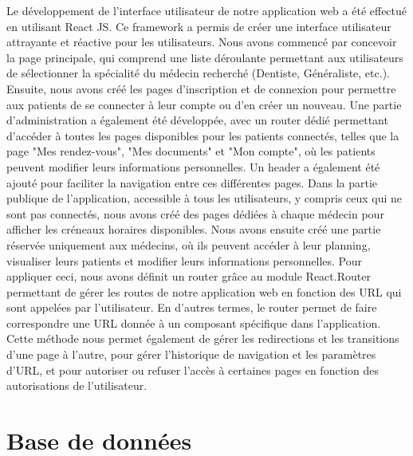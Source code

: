 \documentclass[a4paper]{report}
\begin{document}
Le développement de l'interface utilisateur de notre application web a été effectué en utilisant React JS. Ce framework a permis de créer une 
interface utilisateur attrayante et réactive pour les utilisateurs. \newline\newline
Nous avons commencé par concevoir la page principale, qui comprend une liste 
déroulante permettant aux utilisateurs de sélectionner la spécialité du médecin recherché (Dentiste, Généraliste, etc.). \newline\newline
Ensuite, nous avons créé les pages d'inscription et de connexion pour permettre aux patients de se connecter à leur compte ou d'en créer un nouveau.
Une partie d'administration a également été développée, avec un router dédié permettant d'accéder à toutes les pages disponibles pour les patients 
connectés, telles que la page "Mes rendez-vous", "Mes documents" et "Mon compte", où les patients peuvent modifier leurs informations personnelles. 
Un header a également été ajouté pour faciliter la navigation entre ces différentes pages.\newline\newline
Dans la partie publique de l'application, accessible à tous les utilisateurs, y compris ceux qui ne sont pas connectés, nous avons créé des pages 
dédiées à chaque médecin pour afficher les créneaux horaires disponibles. Nous avons ensuite créé une partie réservée uniquement aux médecins, où 
ils peuvent accéder à leur planning, visualiser leurs patients et modifier leurs informations personnelles. \newline
Pour appliquer ceci, nous avons définit un router grâce au module React.Router permettant de gérer les routes de notre application web en fonction des URL qui sont appelées par l'utilisateur. En d'autres termes, le router permet de faire correspondre une URL donnée à un composant spécifique dans l'application.
Cette méthode nous permet également de gérer les redirections et les transitions d'une page à l'autre, pour gérer l'historique de navigation et les paramètres d'URL, et pour autoriser ou refuser l'accès à certaines pages en fonction des autorisations de l'utilisateur.

\section{Base de données}
\end{document}
